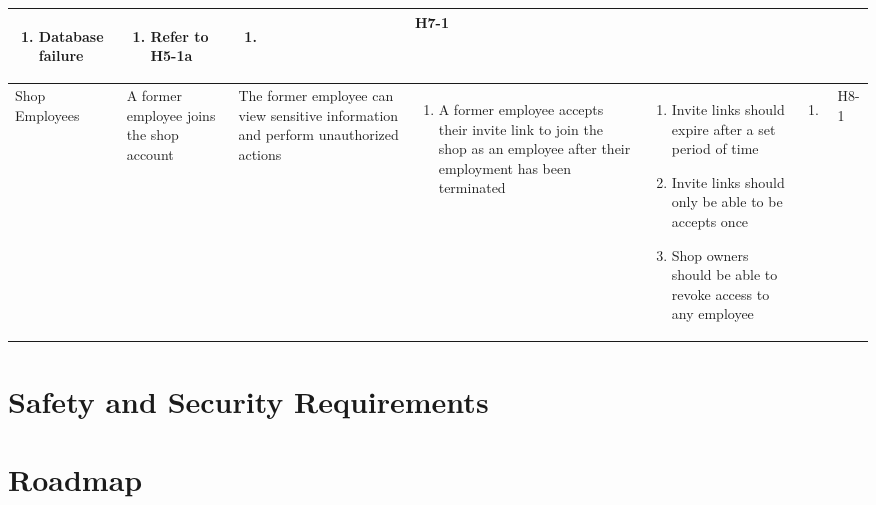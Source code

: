 \documentclass{article}
\begin{document}
\begin{landscape}
\begin{longtable}{|p{}|p{}|p{}|p{}|p{}|p{}|p{}|}
\begin{enumerate}[label=\alph*., leftmargin=*]
			   \item Database failure
		   \end{enumerate}
		 & \begin{enumerate}[label=\alph*., leftmargin=*]
			   \item Refer to H5-1a
		   \end{enumerate}
		 & \begin{enumerate}[label=\alph*., leftmargin=*]
			   \item
		   \end{enumerate}
		 & H7-1                                                                                                        \\
		\hline
		Shop Employees
		 & A former employee joins the shop account
		 & The former employee can view sensitive information and perform unauthorized actions
		 & \begin{enumerate}[label=\alph*., leftmargin=*]
			   \item A former employee accepts their invite link to join the shop as an employee after their employment
			         has been terminated
		   \end{enumerate}
		 & \begin{enumerate}[label=\alph*., leftmargin=*]
			   \item Invite links should expire after a set period of time
			   \item Invite links should only be able to be accepts once
			   \item Shop owners should be able to revoke access to any employee
		   \end{enumerate}
		 & \begin{enumerate}[label=\alph*., leftmargin=*]
			   \item
		   \end{enumerate}
		 & H8-1                                                                                                        \\
		\hline
	\end{longtable}
\end{landscape}

\section{Safety and Security Requirements}


\section{Roadmap}


\end{document}
